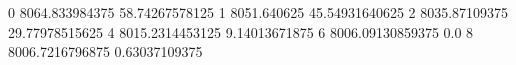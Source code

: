 0 8064.833984375 58.74267578125
1 8051.640625 45.54931640625
2 8035.87109375 29.77978515625
4 8015.2314453125 9.14013671875
6 8006.09130859375 0.0
8 8006.7216796875 0.63037109375
